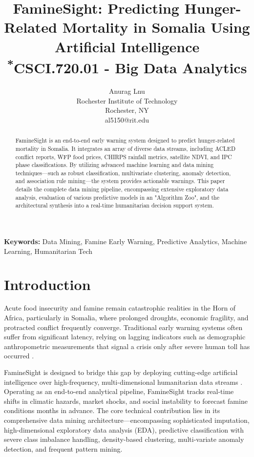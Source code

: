 \documentclass[10pt,twocolumn,letterpaper]{article}
\begin{document}
\title{FamineSight: Predicting Hunger-Related Mortality in Somalia Using Artificial Intelligence\\
{\large \textsuperscript{*}CSCI.720.01 - Big Data Analytics}
}

\author{Anurag Lnu \\
Rochester Institute of Technology \\
Rochester, NY \\
al5150@rit.edu}

\maketitle

\begin{abstract}
FamineSight is an end-to-end early warning system designed to predict hunger-related mortality in Somalia. It integrates an array of diverse data streams, including ACLED conflict reports, WFP food prices, CHIRPS rainfall metrics, satellite NDVI, and IPC phase classifications. By utilizing advanced machine learning and data mining techniques—such as robust classification, multivariate clustering, anomaly detection, and association rule mining—the system provides actionable warnings. This paper details the complete data mining pipeline, encompassing extensive exploratory data analysis, evaluation of various predictive models in an "Algorithm Zoo", and the architectural synthesis into a real-time humanitarian decision support system.
\end{abstract}

\textbf{Keywords:} Data Mining, Famine Early Warning, Predictive Analytics, Machine Learning, Humanitarian Tech

\section{Introduction}
Acute food insecurity and famine remain catastrophic realities in the Horn of Africa, particularly in Somalia, where prolonged droughts, economic fragility, and protracted conflict frequently converge. Traditional early warning systems often suffer from significant latency, relying on lagging indicators such as demographic anthropometric measurements that signal a crisis only after severe human toll has occurred \cite{Maxwell2015}.

FamineSight is designed to bridge this gap by deploying cutting-edge artificial intelligence over high-frequency, multi-dimensional humanitarian data streams \cite{Lentz2020}. Operating as an end-to-end analytical pipeline, FamineSight tracks real-time shifts in climatic hazards, market shocks, and social instability to forecast famine conditions months in advance. The core technical contribution lies in its comprehensive data mining architecture—encompassing sophisticated imputation, high-dimensional exploratory data analysis (EDA), predictive classification with severe class imbalance handling, density-based clustering, multi-variate anomaly detection, and frequent pattern mining.
\end{document}

